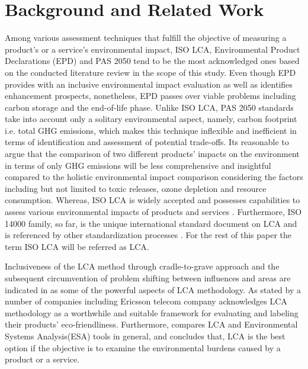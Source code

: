 \documentclass[conference]{IEEEtran}
\begin{document}
\section{Background and Related Work} 

Among various assessment techniques that fulfill the objective of measuring a product's or a service's environmental impact, ISO LCA\cite{ISO140402006}, Environmental Product Declarations (EPD)\cite{iso2006environmental} and PAS 2050 \cite{pas20082050} tend to be the most acknowledged ones based on the conducted literature review in the scope of this study. Even though EPD provides with an inclusive environmental impact evaluation as well as identifies enhancement prospects, nonetheless, EPD passes over viable problems including carbon storage and the end-of-life phase. Unlike ISO LCA, PAS 2050 standards take into account only a solitary environmental aspect, namely, carbon footprint i.e. total GHG emissions, which makes this technique inflexible and inefficient in terms of identification and assessment of potential trade-offs.
Its reasonable to argue that the comparison of two different products' impacts on the environment in terms of only GHG emissions will be less comprehensive and insightful compared to the holistic environmental impact comparison considering the factors including but not limited to toxic releases, ozone depletion and resource consumption. Whereas, ISO LCA is widely accepted and  possesses capabilities to assess various environmental impacts of products and services \cite{cooper2006life}. Furthermore,  ISO 14000 family, so far, is the unique international standard document on LCA and is referenced by other standardization processes \cite{finkbeiner201340s}. For the rest of this paper the term ISO LCA will be referred as LCA.

Inclusiveness of the LCA method through cradle-to-grave approach and the subsequent circumvention of problem shifting between influences and areas are indicated in \cite{hermann2007assessing} as some of the powerful aspects of LCA methodology. As stated by \cite{guldbrandsson2012opportunities} a number of companies including Ericsson telecom company acknowledges LCA methodology as a worthwhile and suitable framework for evaluating and labeling their products' eco-friendliness. Furthermore, \cite{finnveden2000limitations} compares LCA and Environmental Systems Analysis(ESA) tools in general, and concludes that, LCA is the best option if the objective is to examine the environmental burdens caused by a product or a service.
\end{document}
